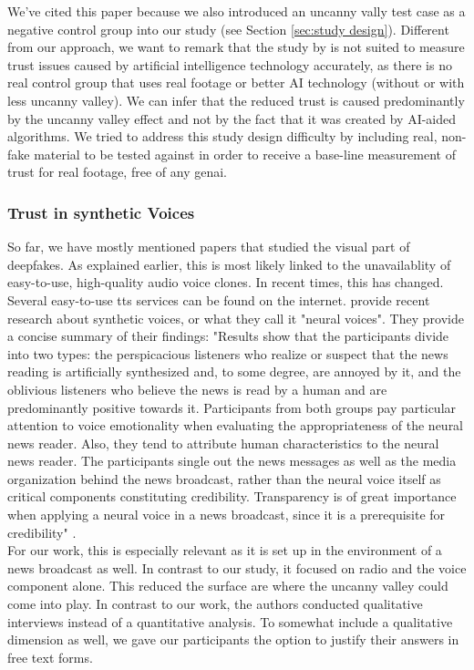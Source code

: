 \documentclass[
  a4paper,  %
  twoside,  %
  bibliography=totoc,
  headsepline,
  cleardoublepage=empty,
  parskip=half,
  draft=false
]{scrbook}
\begin{document}
We've cited this paper because we also introduced an uncanny vally test case as a negative control group into our study (see Section \ref{sec:study design}). Different from our approach, we want to remark that the study by  is not suited to measure trust issues caused by artificial intelligence technology accurately, as there is no real control group that uses real footage or better AI technology (without or with less uncanny valley). We can infer that the reduced trust is caused predominantly by the uncanny valley effect and not by the fact that it was created by AI-aided algorithms. We tried to address this study design difficulty by including real, non-fake material to be tested against in order to receive a base-line measurement of trust for real footage, free of any \gls{genai}.

\subsubsection*{Trust in synthetic Voices}
So far, we have mostly mentioned papers that studied the visual part of deepfakes. As explained earlier, this is most likely linked to the unavailablity of easy-to-use, high-quality audio voice clones. In recent times, this has changed. Several easy-to-use \gls{tts} services can be found on the internet.  provide recent research about synthetic voices, or what they call it "neural voices". They provide a concise summary of their findings: "Results show that the participants divide into two types: the perspicacious listeners who realize or suspect that the news reading is artificially synthesized and, to some degree, are annoyed by it, and the oblivious listeners who believe the news is read by a human and are predominantly positive towards it. Participants from both groups pay particular attention to voice emotionality when evaluating the appropriateness of the neural news reader. Also, they tend to attribute human characteristics to the neural news reader. The participants single out the news messages as well as the media organization behind the news broadcast, rather than the neural voice itself as critical components constituting credibility. Transparency is of great importance when applying a neural voice in a news broadcast, since it is a prerequisite for credibility" \cite{heiselbergAutomatedNewsReading2022}. \\
For our work, this is especially relevant as it is set up in the environment of a news broadcast as well. In contrast to our study, it focused on radio and the voice component alone. This reduced the surface are where the uncanny valley could come into play. In contrast to our work, the authors conducted qualitative interviews instead of a quantitative analysis. To somewhat include a qualitative dimension as well, we gave our participants the option to justify their answers in free text forms. 
\end{document}
